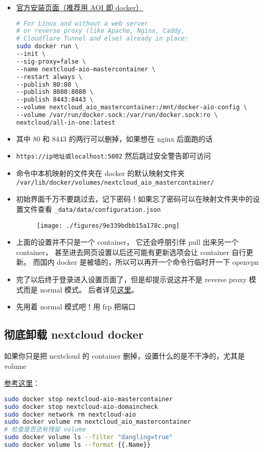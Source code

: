 
\begin{itemize}
\item \href{https://nextcloud.com/install/}{官方安装页面（推荐用 AOI 即 docker）}
\begin{lstlisting}[language=bash]
# For Linux and without a web server
# or reverse proxy (like Apache, Nginx, Caddy,
# Cloudflare Tunnel and else) already in place:
sudo docker run \
--init \
--sig-proxy=false \
--name nextcloud-aio-mastercontainer \
--restart always \
--publish 80:80 \
--publish 8080:8080 \
--publish 8443:8443 \
--volume nextcloud_aio_mastercontainer:/mnt/docker-aio-config \
--volume /var/run/docker.sock:/var/run/docker.sock:ro \
nextcloud/all-in-one:latest
\end{lstlisting}
\item 其中 80 和 8443 的两行可以删掉，如果想在 nginx 后面跑的话
\item \verb`https://ip地址或localhost:5002` 然后跳过安全警告即可访问
\item 命令中本机映射的文件夹在 docker 的默认映射文件夹 \verb`/var/lib/docker/volumes/nextcloud_aio_mastercontainer/`
\item 初始界面千万不要跳过去，记下密码！如果忘了密码可以在映射文件夹中的设置文件查看 \verb`_data/data/configuration.json`
\begin{figure}[ht]
\centering
\texttt{[image: ./figures/9e339bdbb15a178c.png]}
\caption{} \label{fig_nxclou_1}
\end{figure}
\item 上面的设置并不只是一个 container， 它还会呼朋引伴 pull 出来另一个 container， 甚至进去网页设置以后还可能有更新选项会让 container 自行更新。 而国内 docker 是被墙的，所以可以再开一个命令行临时开一下 openvpn
\item 完了以后终于登录进入设置页面了，但是却提示说这并不是 reverse proxy 模式而是 normal 模式。 后者详见\href{https://github.com/nextcloud/all-in-one/blob/main/reverse-proxy.md}{这里}。
\item 先用着 normal 模式吧！用 frp 把端口 
\end{itemize}

\subsection{彻底卸载 nextcloud docker}
如果你只是把 nextcloud 的 container 删掉，设置什么的是不干净的，尤其是 volume

\href{https://github.com/nextcloud/all-in-one#how-to-properly-reset-the-instance}{参考这里}：
\begin{lstlisting}[language=bash]
sudo docker stop nextcloud-aio-mastercontainer
sudo docker stop nextcloud-aio-domaincheck
sudo docker network rm nextcloud-aio
sudo docker volume rm nextcloud_aio_mastercontainer
# 检查是否还有残留 volume
sudo docker volume ls --filter "dangling=true"
sudo docker volume ls --format {{.Name}}
\end{lstlisting}
